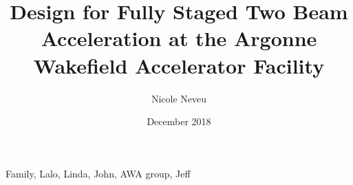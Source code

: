\documentclass[table]{iitthesis}
\begin{document}
\title{Design for Fully Staged Two Beam Acceleration at the Argonne Wakefield Accelerator Facility}

\author{Nicole Neveu }
\date{December 2018}
\copyrightnoticetrue      %
\maketitle                %


\prelimpages         %

\begin{acknowledgement}     %
	\par  Family, Lalo, Linda, John, AWA group, Jeff
\end{acknowledgement}

\tableofcontents
\clearpage

\listoftables
\clearpage

\listoffigures
\clearpage


\listofsymbols
{}

\clearpage
\end{document}
